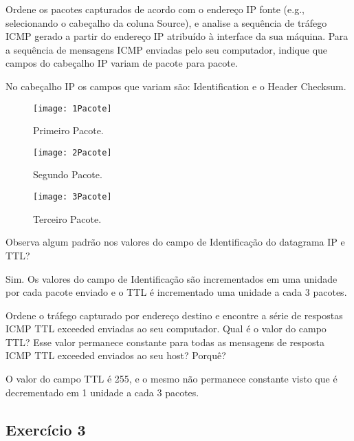 \documentclass{exam}
\begin{document}
\begin{questions}
\question Ordene os pacotes capturados de acordo com o endere\c{c}o IP fonte (e.g.,
selecionando o cabe\c{c}alho da coluna Source), e analise a sequência de tráfego ICMP gerado a partir do endere\c{c}o IP atribuído à interface da sua máquina. Para a sequência de mensagens ICMP enviadas pelo seu computador, indique que campos do cabe\c{c}alho IP variam de pacote para pacote.
\begin{solution}[2in]
No cabe\c{c}alho IP os campos que variam são: Identification e o Header Checksum.
\begin{figure}[H]
\centering\texttt{[image: 1Pacote]} 
\caption{\label{fig:controller}Primeiro Pacote.}
\end{figure} 
\begin{figure}[H]
\centering\texttt{[image: 2Pacote]} 
\caption{\label{fig:controller}Segundo Pacote.}
\end{figure} 
\begin{figure}[H]
\centering\texttt{[image: 3Pacote]} 
\caption{\label{fig:controller}Terceiro Pacote.}
\end{figure} 
\end{solution}

\question Observa algum padrão nos valores do campo de Identificação do datagrama IP e TTL?
\begin{solution}[2in]
Sim. Os valores do campo de Identificação são incrementados em uma unidade por cada pacote enviado e o TTL  é incrementado uma unidade a cada 3 pacotes.
\end{solution}

\question Ordene o tráfego capturado por endereço destino e encontre a série de respostas ICMP TTL exceeded 
enviadas ao seu computador. Qual é o valor do campo TTL? Esse valor permanece constante
para todas as mensagens de resposta ICMP TTL exceeded enviados ao seu host? Porquê?
\begin{solution}[2in]
O valor do campo TTL  é 255, e o mesmo não permanece constante visto que é decrementado em 1 unidade a cada 3 pacotes.
\end{solution}

\end{questions}

\subsection{Exercício 3}
\end{document}
